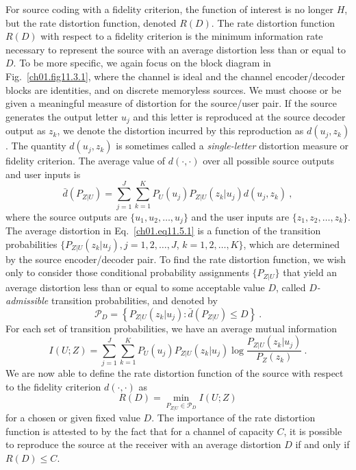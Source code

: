 For source coding with a fidelity criterion, the function of interest
is no longer $H$, but the rate distortion function, denoted $R(D)$.
The rate distortion function $R(D)$ with respect to a fidelity
criterion is the minimum information rate necessary to represent the source
with an average distortion less than or equal to $D$.
To be more specific, we again focus on the block diagram in
Fig.~\ref{ch01.fig11.3.1}, where the channel is ideal and the channel
encoder/decoder blocks are identities, and on discrete memoryless sources.
We must choose or be given a meaningful measure of distortion
for the source/user pair.
If the source generates the output letter $u_j$ and this letter is reproduced
at the source decoder output as $z_k$, we denote the distortion
incurred by this reproduction as $d(u_j, z_k)$.
The quantity $d(u_j, z_k)$  is sometimes called a \textit{single-letter}
distortion measure or fidelity criterion.
The average value of $d(\cdot,\cdot)$ over all possible source
outputs and user inputs is
\begin{equation}
\displaystyle
  \bar{d} \left( P_{Z|U}  \right) =
    \sum^J _{j=1} \sum^K _{k=1}
      P_U \left( u_j \right)
       P_{Z|U} \left( z_k | u_j \right)
          d \left( u_j, z_k \right) ~,
\label{ch01.eq11.5.1}
\end{equation}
where the source outputs are $\{ u_1, u_2, \ldots, u_j \}$
and the user inputs are $\{ z_1, z_2, \ldots, z_k \}$.
The average distortion in Eq.~\eqref{ch01.eq11.5.1}
is a function of the transition probabilities
$\{ P_{Z|U} ( z_k | u_j ), j = 1, 2, \ldots, J$,
$k=1, 2, \ldots, K \}$, which are determined by the
source encoder/decoder pair.
To find the rate distortion function, we wish only to consider
those conditional probability assignments $\{P_{Z|U}\}$
that yield an average distortion less than or equal to some acceptable
value $D$, called $D$\textit{-admissible} transition probabilities,
and denoted by
\begin{equation}
      {\mathcal P}_D = \left\{ P_{Z|U} \left( z_k | u_j \right) :
          \bar{d}
   \left( P_{Z|U} \right) \leq D
       \right\}~.
\label{ch01.eq11.5.2}
\end{equation}
For each set of transition probabilities, we have an average mutual information
\begin{equation}
\displaystyle
   I\left( U;Z\right) =
    \sum^J _{j=1} \sum^K _{k=1}
      P_U \left( u_j \right)
       P_{Z|U} \left( z_k | u_j \right)
       \log
       \frac{ P_{Z|U} \left( z_k | u_j \right)}
            {P_Z \left( z_k \right)}~.
\label{ch01.eq11.5.3}
\end{equation}
We are now able to define the rate distortion function of the
source with respect  to the fidelity criterion $d(\cdot,\cdot)$  as
\begin{equation}
  R(D) =
    \min_{ P_{Z|U} \in {\mathcal P}_D }
       I \left( U; Z\right)
\label{ch01.eq11.5.4}
\end{equation}
for a chosen or given fixed value $D$.
The importance of the rate distortion function is attested to by the
fact that for a channel of capacity $C$, it is possible to reproduce
the source at the receiver with an average distortion $D$ if and only if
$R(D) \leq C$.

